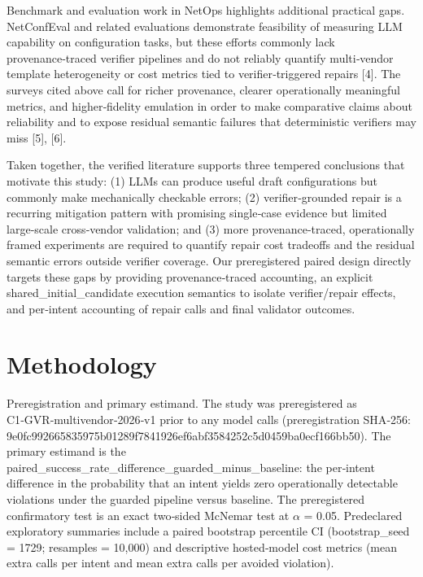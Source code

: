 \documentclass[conference]{IEEEtran}
\begin{document}
Benchmark and evaluation work in NetOps highlights additional practical gaps. NetConfEval and related evaluations demonstrate feasibility of measuring LLM capability on configuration tasks, but these efforts commonly lack provenance‑traced verifier pipelines and do not reliably quantify multi‑vendor template heterogeneity or cost metrics tied to verifier‑triggered repairs [4]. The surveys cited above call for richer provenance, clearer operationally meaningful metrics, and higher‑fidelity emulation in order to make comparative claims about reliability and to expose residual semantic failures that deterministic verifiers may miss [5], [6].

Taken together, the verified literature supports three tempered conclusions that motivate this study: (1) LLMs can produce useful draft configurations but commonly make mechanically checkable errors; (2) verifier‑grounded repair is a recurring mitigation pattern with promising single‑case evidence but limited large‑scale cross‑vendor validation; and (3) more provenance‑traced, operationally framed experiments are required to quantify repair cost tradeoffs and the residual semantic errors outside verifier coverage. Our preregistered paired design directly targets these gaps by providing provenance‑traced accounting, an explicit shared\_initial\_candidate execution semantics to isolate verifier/repair effects, and per‑intent accounting of repair calls and final validator outcomes.

\section{Methodology}
Preregistration and primary estimand. The study was preregistered as C1‑GVR‑multivendor‑2026‑v1 prior to any model calls (preregistration SHA‑256: 9e0fc992\allowbreak{}66583597\allowbreak{}5b01289f\allowbreak{}7841926e\allowbreak{}f6abf358\allowbreak{}4252c5d0\allowbreak{}459ba0ec\allowbreak{}f166bb50). The primary estimand is the paired\_success\_rate\_difference\_guarded\_minus\_baseline: the per‑intent difference in the probability that an intent yields zero operationally detectable violations under the guarded pipeline versus baseline. The preregistered confirmatory test is an exact two‑sided McNemar test at \ensuremath{\alpha} = 0.05. Predeclared exploratory summaries include a paired bootstrap percentile CI (bootstrap\_seed = 1729; resamples = 10,000) and descriptive hosted‑model cost metrics (mean extra calls per intent and mean extra calls per avoided violation).
\end{document}
